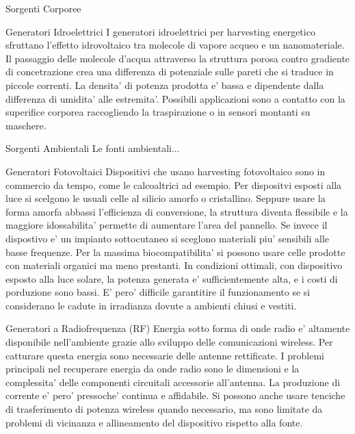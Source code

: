 \begin{section}{Sorgenti Corporee}
   \begin{subsection}{Generatori Idroelettrici}
    I generatori idroelettrici per harvesting energetico sfruttano l'effetto idrovoltaico tra molecole di vapore acqueo e un nanomateriale. Il passaggio delle molecole d'acqua attraverso la struttura porosa contro gradiente di concetrazione crea una differenza di potenziale sulle pareti che si traduce in piccole correnti. La densita' di potenza prodotta e' bassa e dipendente dalla differenza di umidita' alle estremita'. Possibili applicazioni sono a contatto con la superifice corporea raccogliendo la traspirazione o in sensori montanti su maschere. 
   \end{subsection}
\end{section}


\begin{section}{Sorgenti Ambientali}
    Le fonti ambientali...
    \begin{subsection}{Generatori Fotovoltaici}
    Dispositivi che usano harvesting fotovoltaico sono in commercio da tempo, come le calcoaltrici ad esempio. Per dispositvi esposti alla luce si scelgono le usuali celle al silicio amorfo o cristallino. Seppure usare la forma amorfa abbassi l'efficienza di conversione, la struttura diventa flessibile e la maggiore idossabilita' permette di aumentare l'area del pannello. Se invece il dispostivo e' un impianto sottocutaneo si sceglono materiali piu' sensibili alle basse frequenze. Per la massima biocompatibilita' si possono usare celle prodotte con materiali organici ma meno prestanti. In condizioni ottimali, con dispositivo esposto alla luce solare, la potenza generata e' sufficientemente alta, e i costi di porduzione sono bassi. E' pero' difficile garantitire il funzionamento se si considerano le cadute in irradianza dovute a ambienti chiusi e vestiti.
    \end{subsection}

    \begin{subsection}{Generatori a Radiofrequenza (RF)}
    Energia sotto forma di onde radio e' altamente disponibile nell'ambiente grazie allo sviluppo delle comunicazioni wireless. Per catturare questa energia sono necessarie delle antenne rettificate. I problemi principali nel recuperare energia da onde radio sono le dimensioni e la complessita' delle componenti circuitali accessorie all'antenna. La produzione di corrente e' pero' pressoche' continua e affidabile. Si possono anche usare tenciche di trasferimento di potenza wireless quando necessario, ma sono limitate da problemi di vicinanza e allineamento del dispositivo rispetto alla fonte. 
    \end{subsection}
\end{section}

